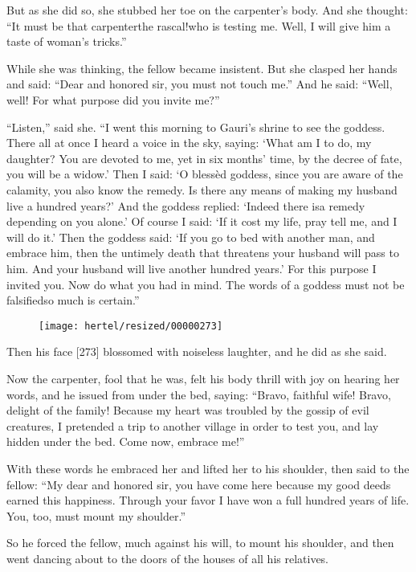 \documentclass[article, twoside, 10pt]{memoir}
\begin{document}
But as she did so, she stubbed her toe on the carpenter's body. And
she thought:
``It must be that carpenter{\textemdash}the rascal!{\textemdash}who is testing me. Well, I will give him a taste of woman's tricks.''

While she was thinking, the fellow became insistent. But she
clasped her hands and said:
``Dear and honored sir, you must not touch me.'' And he said:
``Well, well! For what purpose did you invite me?''

``Listen,'' said she.
``I went this morning to Gauri's shrine to see the goddess. There all at once I heard a voice in the sky, saying: `What am I to do, my daughter? You are devoted to me, yet in six months' time, by the decree of fate, you will be a widow.' Then I said: `O blessèd goddess, since you are aware of the calamity, you also know the remedy. Is there any means of making my husband live a hundred years?' And the goddess replied: `Indeed there is{\textemdash}a remedy depending on you alone.' Of course I said: `If it cost my life, pray tell me, and I will do it.' Then the goddess said: `If you go to bed with another man, and embrace him, then the untimely death that threatens your husband will pass to him. And your husband will live another hundred years.' For this purpose I invited you. Now do what you had in mind. The words of a goddess must not be falsified{\textemdash}so much is certain.''
\begin{figure}[p]\texttt{[image: hertel/resized/00000273]}\end{figure}Then his face [273] blossomed with noiseless laughter, and he did
as she said.

Now the carpenter, fool that he was, felt his body thrill with joy
on hearing her words, and he issued from under the bed, saying:
``Bravo, faithful wife! Bravo, delight of the family! Because my heart was troubled by the gossip of evil creatures, I pretended a trip to another village in order to test you, and lay hidden under the bed. Come now, embrace me!''

With these words he embraced her and lifted her to his shoulder,
then said to the fellow:
``My dear and honored sir, you have come here because my good deeds earned this happiness. Through your favor I have won a full hundred years of life. You, too, must mount my shoulder.''

So he forced the fellow, much against his will, to mount his
shoulder, and then went dancing about to the doors of the houses of
all his relatives.
\end{document}
